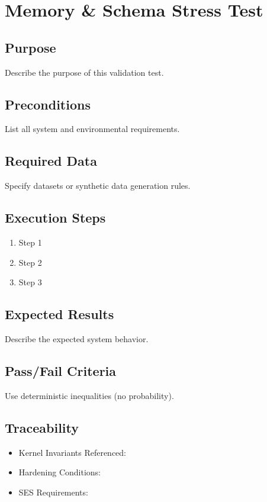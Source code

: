 

\section*{Memory & Schema Stress Test}

\subsection*{Purpose}
Describe the purpose of this validation test.

\subsection*{Preconditions}
List all system and environmental requirements.

\subsection*{Required Data}
Specify datasets or synthetic data generation rules.

\subsection*{Execution Steps}
\begin{enumerate}
    \item Step 1
    \item Step 2
    \item Step 3
\end{enumerate}

\subsection*{Expected Results}
Describe the expected system behavior.

\subsection*{Pass/Fail Criteria}
Use deterministic inequalities (no probability).

\subsection*{Traceability}
\begin{itemize}
    \item Kernel Invariants Referenced:
    \item Hardening Conditions:
    \item SES Requirements:
\end{itemize}
